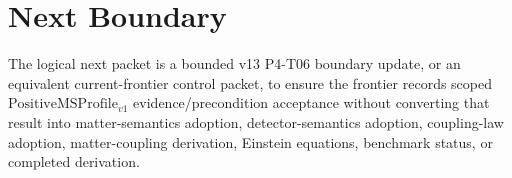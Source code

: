 \documentclass[11pt]{article}
\newcommand{\PositiveMSProfile}{\mathrm{PositiveMSProfile}_{v1}}
\begin{document}
\section{Next Boundary}

The logical next packet is a bounded v13 P4-T06 boundary update, or an
equivalent current-frontier control packet, to ensure the frontier records
scoped \(\PositiveMSProfile\) evidence/precondition acceptance without
converting that result into matter-semantics adoption, detector-semantics
adoption, coupling-law adoption, matter-coupling derivation, Einstein
equations, benchmark status, or completed derivation.
\end{document}
